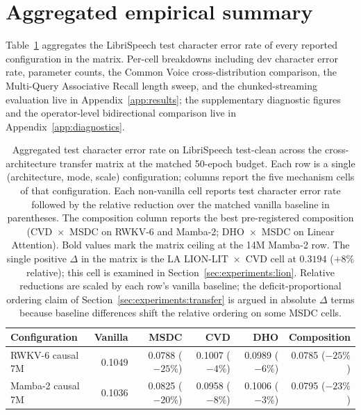 \section{Aggregated empirical summary}\label{sec:experiments:summary}

Table~\ref{tab:results:aggregated} aggregates the LibriSpeech test
character error rate of every reported configuration in the
matrix. Per-cell breakdowns including dev character error rate,
parameter counts, the Common Voice cross-distribution comparison,
the Multi-Query Associative Recall length sweep, and the
chunked-streaming evaluation live in
Appendix~\ref{app:results}; the supplementary diagnostic figures
and the operator-level bidirectional comparison live in
Appendix~\ref{app:diagnostics}.

\begin{table}[!htbp]
\centering
\small
\caption[Aggregated test character error rate across the
matrix]{Aggregated test character error rate on LibriSpeech
test-clean across the cross-architecture transfer matrix at the
matched 50-epoch budget. Each row is a single
(architecture, mode, scale) configuration; columns report the
five mechanism cells of that configuration. Each non-vanilla
cell reports test character error rate followed by the relative
reduction over the matched vanilla baseline in parentheses.
The composition column reports the best pre-registered
composition (CVD~$\times$~MSDC on RWKV-6 and Mamba-2;
DHO~$\times$~MSDC on Linear Attention). Bold values mark the
matrix ceiling at the 14M Mamba-2 row. The single positive
$\Delta$ in the matrix is the LA LION-LIT~$\times$~CVD cell at
$0.3194$ ($+8\%$ relative); this cell is examined in
Section~\ref{sec:experiments:lion}. Relative reductions are
scaled by each row's vanilla baseline; the deficit-proportional
ordering claim of Section~\ref{sec:experiments:transfer} is
argued in absolute $\Delta$ terms because baseline differences
shift the relative ordering on some MSDC cells.}
\label{tab:results:aggregated}
\setlength{\tabcolsep}{4pt}
\renewcommand{\arraystretch}{1.20}
\begin{tabularx}{\linewidth}{@{}X r r r r r@{}}
\toprule
\textbf{Configuration} &
\textbf{Vanilla} & \textbf{MSDC} & \textbf{CVD} &
\textbf{DHO} & \textbf{Composition} \\
\midrule
RWKV-6 causal 7M       & 0.1049 & 0.0788 ($-25\%$) & 0.1007 ($-4\%$) & 0.0989 ($-6\%$) & 0.0785 ($-25\%$) \\
Mamba-2 causal 7M      & 0.1036 & 0.0825 ($-20\%$) & 0.0958 ($-8\%$) & 0.1006 ($-3\%$) & 0.0795 ($-23\%$) \\

\end{tabularx}
\end{table}
